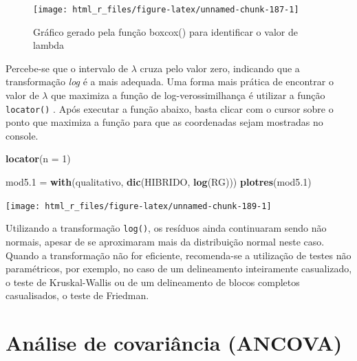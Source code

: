 \documentclass[
]{book}
\newenvironment{Shaded}{\begin{snugshade}}{\end{snugshade}}
\newcommand{\DataTypeTok}[1]{\textcolor[rgb]{0.13,0.29,0.53}{#1}}
\newcommand{\DecValTok}[1]{\textcolor[rgb]{0.00,0.00,0.81}{#1}}
\newcommand{\FloatTok}[1]{\textcolor[rgb]{0.00,0.00,0.81}{#1}}
\newcommand{\KeywordTok}[1]{\textcolor[rgb]{0.13,0.29,0.53}{\textbf{#1}}}
\newcommand{\NormalTok}[1]{#1}
\newcommand{\StringTok}[1]{\textcolor[rgb]{0.31,0.60,0.02}{#1}}
\begin{document}
\begin{figure}

{\centering \texttt{[image: html\_r\_files/figure-latex/unnamed-chunk-187-1]} 

}

\caption{Gráfico gerado pela função boxcox() para identificar o valor de lambda}\label{fig:unnamed-chunk-187}
\end{figure}

Percebe-se que o intervalo de \(\lambda\) cruza pelo valor zero, indicando que a transformação \emph{log} é a mais adequada. Uma forma mais prática de encontrar o valor de \(\lambda\) que maximiza a função de log-verossimilhança  é utilizar a função \texttt{locator()} . Após executar a função abaixo, basta clicar com o cursor sobre o ponto que maximiza a função para que as coordenadas sejam mostradas no console.

\begin{Shaded}
\begin{Highlighting}[]
\KeywordTok{locator}\NormalTok{(}\DataTypeTok{n =} \DecValTok{1}\NormalTok{)}
\end{Highlighting}
\end{Shaded}

\begin{Shaded}
\begin{Highlighting}[]

\NormalTok{mod5}\FloatTok{.1}\NormalTok{  =}\StringTok{ }\KeywordTok{with}\NormalTok{(qualitativo, }\KeywordTok{dic}\NormalTok{(HIBRIDO, }\KeywordTok{log}\NormalTok{(RG)))}
\KeywordTok{plotres}\NormalTok{(mod5}\FloatTok{.1}\NormalTok{)}
\end{Highlighting}
\end{Shaded}

\begin{center}\texttt{[image: html\_r\_files/figure-latex/unnamed-chunk-189-1]} \end{center}

Utilizando a transformação \texttt{log()}, os resíduos ainda continuaram sendo não normais, apesar de se aproximaram mais da distribuição normal neste caso. Quando a transformação não for eficiente, recomenda-se a utilização de testes não paramétricos, por exemplo, no caso de um delineamento inteiramente casualizado, o teste de Kruskal-Wallis ou de um delineamento de blocos completos casualisados, o teste de Friedman.

\hypertarget{ancova}{%
\section{Análise de covariância (ANCOVA)}\label{ancova}}
\end{document}
